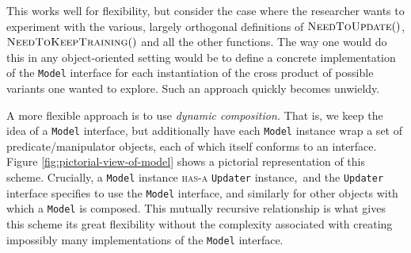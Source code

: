 \documentclass[a4paper]{article}
\newcommand{\noun}[1]{\textsc{#1}}
\begin{document}
This works well for flexibility, but consider the case where the researcher
wants to experiment with the various, largely orthogonal definitions
of $\Call{NeedToUpdate}{}()$, $\Call{NeedToKeepTraining}{}()$ and
all the other functions. The way one would do this in any object-oriented
setting would be to define a concrete implementation of the \texttt{Model}
interface for each instantiation of the cross product of possible
variants one wanted to explore. Such an approach quickly becomes unwieldy.

A more flexible approach is to use \emph{dynamic composition. }That is, we
keep\emph{ }the idea of a \texttt{Model} interface, but additionally
have each \texttt{Model} instance wrap a set of predicate/manipulator
objects, each of which itself conforms to an interface. Figure \ref{fig:pictorial-view-of-model}
shows a pictorial representation of this scheme. Crucially, a \texttt{Model}
instance \noun{has-a} \texttt{Updater} instance,\texttt{ }and the
\texttt{Updater} interface specifies to use the \texttt{Model} interface,
and similarly for other objects with which a \texttt{Model} is composed.
This mutually recursive relationship is what gives this scheme its
great flexibility without the complexity associated with creating
impossibly many implementations of the \texttt{Model} interface.
\end{document}
